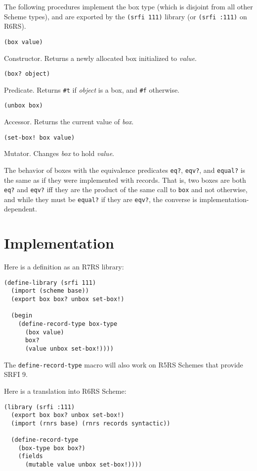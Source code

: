 The following procedures implement the box type (which is disjoint from
all other Scheme types), and are exported by the \texttt{(srfi\ 111)}
library (or \texttt{(srfi\ :111)} on R6RS).

\texttt{(box\ value)}

Constructor. Returns a newly allocated box initialized to \emph{value}.

\texttt{(box?\ object)}

Predicate. Returns \texttt{\#t} if \emph{object} is a box, and
\texttt{\#f} otherwise.

\texttt{(unbox\ box)}

Accessor. Returns the current value of \emph{box}.

\texttt{(set-box!\ box\ value)}

Mutator. Changes \emph{box} to hold \emph{value}.

The behavior of boxes with the equivalence predicates \texttt{eq?},
\texttt{eqv?}, and \texttt{equal?} is the same as if they were
implemented with records. That is, two boxes are both \texttt{eq?} and
\texttt{eqv?} iff they are the product of the same call to \texttt{box}
and not otherwise, and while they must be \texttt{equal?} if they are
\texttt{eqv?}, the converse is implementation-dependent.

\section{Implementation}\label{implementation}

Here is a definition as an R7RS library:

\begin{verbatim}
(define-library (srfi 111)
  (import (scheme base))
  (export box box? unbox set-box!)
  
  (begin
    (define-record-type box-type
      (box value)
      box?
      (value unbox set-box!))))
\end{verbatim}

The \texttt{define-record-type} macro will also work on R5RS Schemes
that provide SRFI 9.

Here is a translation into R6RS Scheme:

\begin{verbatim}
(library (srfi :111)
  (export box box? unbox set-box!)
  (import (rnrs base) (rnrs records syntactic))
  
  (define-record-type
    (box-type box box?)
    (fields
      (mutable value unbox set-box!))))
\end{verbatim}

